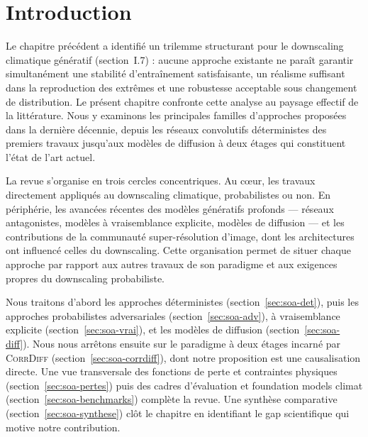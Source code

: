 \documentclass[14pt,a4paper,openany]{extreport}
\theoremstyle{definition}
\newcommand{\CorrDiff}{\textsc{CorrDiff}}
\begin{document}
\vspace{1.5em}

\section{Introduction}
\label{sec:soa-intro}

Le chapitre précédent a identifié un trilemme structurant pour le downscaling climatique génératif (section~I.7) : aucune approche existante ne paraît garantir simultanément une stabilité d'entraînement satisfaisante, un réalisme suffisant dans la reproduction des extrêmes et une robustesse acceptable sous changement de distribution. Le présent chapitre confronte cette analyse au paysage effectif de la littérature. Nous y examinons les principales familles d'approches proposées dans la dernière décennie, depuis les réseaux convolutifs déterministes des premiers travaux jusqu'aux modèles de diffusion à deux étages qui constituent l'état de l'art actuel.

La revue s'organise en trois cercles concentriques. Au cœur, les travaux directement appliqués au downscaling climatique, probabilistes ou non. En périphérie, les avancées récentes des modèles génératifs profonds --- réseaux antagonistes, modèles à vraisemblance explicite, modèles de diffusion --- et les contributions de la communauté super-résolution d'image, dont les architectures ont influencé celles du downscaling. Cette organisation permet de situer chaque approche par rapport aux autres travaux de son paradigme et aux exigences propres du downscaling probabiliste.

Nous traitons d'abord les approches déterministes (section~\ref{sec:soa-det}), puis les approches probabilistes adversariales (section~\ref{sec:soa-adv}), à vraisemblance explicite (section~\ref{sec:soa-vrai}), et les modèles de diffusion (section~\ref{sec:soa-diff}). Nous nous arrêtons ensuite sur le paradigme à deux étages incarné par \CorrDiff{} (section~\ref{sec:soa-corrdiff}), dont notre proposition est une causalisation directe. Une vue transversale des fonctions de perte et contraintes physiques (section~\ref{sec:soa-pertes}) puis des cadres d'évaluation et foundation models climat (section~\ref{sec:soa-benchmarks}) complète la revue. Une synthèse comparative (section~\ref{sec:soa-synthese}) clôt le chapitre en identifiant le gap scientifique qui motive notre contribution.
\end{document}
